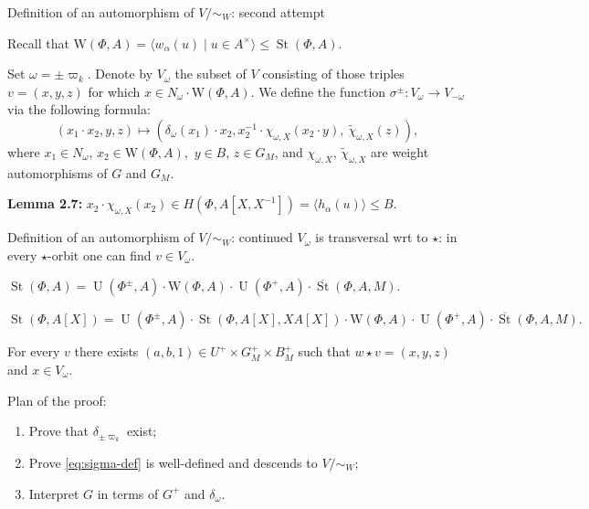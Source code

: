 \documentclass{beamer} %
\DeclareMathOperator{\St}{St}
\DeclareMathOperator{\UU}{U}
\theoremstyle{definition}
\begin{document}
\begin{frame}{Definition of an automorphism of $V/\sim_W$: second attempt}

Recall that $\mathrm{W}(\Phi, A) = \langle w_\alpha(u) \mid u \in A^\times \rangle \leq \St(\Phi, A)$.

\pause Set $\omega = \pm \varpi_k$. Denote by $V_\omega$ the subset of $V$ consisting of those triples $v = (x, y, z)$ for which $x \in N_\omega\cdot \mathrm{W}(\Phi, A)$.
\pause We define the function $\sigma^\pm \colon V_\omega \to V_{-\omega}$ via the following formula:
\begin{equation} \label{eq:sigma-def} (x_1 \cdot x_2, y, z) \mapsto (\delta_\omega(x_1)\cdot x_2, x_2^{-1} \cdot \chi_{\omega, X}(x_2 \cdot y),\  \widetilde{\chi}_{\omega, X}(z)), \end{equation}
where $x_1 \in N_\omega$, $x_2 \in \mathrm{W}(\Phi, A)$,\ $y \in B$, $z \in G_M$, and
$\chi_{\omega, X}$, $\widetilde{\chi}_{\omega, X}$ are weight automorphisms of $G$ and $G_M$.

\pause \textbf{Lemma 2.7:} $x_2 \cdot \chi_{\omega, X}(x_2) \in H(\Phi, A[X, X^{-1}]) = \langle h_\alpha(u) \rangle\leq B$.
\end{frame}

\begin{frame}{Definition of an automorphism of $V/\sim_W$: continued}
 $V_\omega$ is transversal wrt to $\star$: in every $\star$-orbit one can find $v \in V_\omega$.
 \pause \begin{lemma}
  $\St(\Phi,A) =\UU(\Phi^\pm, A)\cdot \mathrm{W}(\Phi, A) \cdot \UU(\Phi^+, A) \cdot \overline{\St}(\Phi, A, M).$
 \end{lemma}
 \pause \begin{corollary}
  \scriptsize { $\St(\Phi,A[X]) =\UU(\Phi^\pm, A) \cdot \St(\Phi, A[X], XA[X]) \cdot \mathrm{W}(\Phi, A) \cdot \UU(\Phi^+, A) \cdot \overline{\St}(\Phi, A, M).$ }
 \end{corollary}

 \pause For every $v$ there exists $(a, b, 1) \in U^+ \times G_M^+\times B_M^+$ such that $w \star v = (x, y, z)$ and $x \in V_\omega$.

\end{frame}


\begin{frame}{Plan of the proof:}
\begin{enumerate}
 \pause \item Prove that $\delta_{\pm \varpi_k}$ exist;
 \pause \item Prove \eqref{eq:sigma-def} is well-defined and descends to $V/\sim_W$;
 \pause \item Interpret $G$ in terms of $G^+$ and $\delta_\omega$.
\end{enumerate}
\end{frame}
\end{document}
